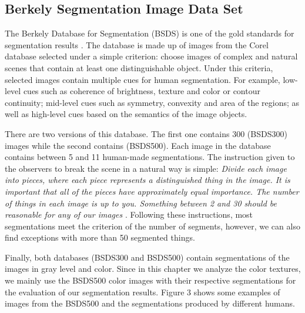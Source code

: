\subsection{Berkely Segmentation Image Data Set}
The Berkely Database for Segmentation (BSDS) is one of the gold standards for segmentation results \citep{Martin.Fowlkes.ea:ICCV:2001}. The database is made up of images from the Corel database selected under a simple criterion: choose images of complex and natural scenes that contain at least one distinguishable object. Under this criteria, selected images contain multiple cues for human segmentation. For example, low-level cues such as coherence of brightness, texture and color or contour continuity; mid-level cues such as symmetry, convexity and area of the regions; as well as high-level cues based on the semantics of the image objects.

There are two versions of this database. The first one contains 300 (BSDS300) images while the second contains (BSDS500). Each image in the database contains between 5 and 11 human-made segmentations. The instruction given to the observers to break the scene in a natural way is simple: \textit{Divide each image into pieces, where each piece represents a distinguished thing in the image. It is important that all of the pieces have approximately equal importance. The number of things in each image is up to you. Something between 2 and 30 should be reasonable for any of our images }\citep{Martin.Fowlkes.ea:ICCV:2001}. Following these instructions, most segmentations meet the criterion of the number of segments, however, we can also find exceptions with more than 50 segmented things.

Finally, both databases (BSDS300 and BSDS500) contain segmentations of the images in gray level and color. Since in this chapter we analyze the color textures, we mainly use the BSDS500 color images with their respective segmentations for the evaluation of our segmentation results. Figure 3 shows some examples of images from the BSDS500 and the segmentations produced by different humans.

